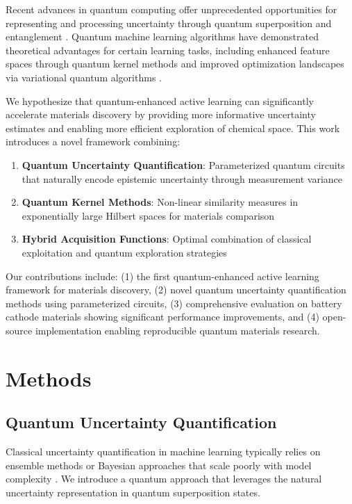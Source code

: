 \documentclass[twocolumn]{article}
\begin{document}
Recent advances in quantum computing offer unprecedented opportunities for representing and processing uncertainty through quantum superposition and entanglement \cite{biamonte2017quantum}. Quantum machine learning algorithms have demonstrated theoretical advantages for certain learning tasks, including enhanced feature spaces through quantum kernel methods \cite{havlicek2019supervised} and improved optimization landscapes via variational quantum algorithms \cite{cerezo2021variational}.

We hypothesize that quantum-enhanced active learning can significantly accelerate materials discovery by providing more informative uncertainty estimates and enabling more efficient exploration of chemical space. This work introduces a novel framework combining:

\begin{enumerate}
\item \textbf{Quantum Uncertainty Quantification}: Parameterized quantum circuits that naturally encode epistemic uncertainty through measurement variance
\item \textbf{Quantum Kernel Methods}: Non-linear similarity measures in exponentially large Hilbert spaces for materials comparison
\item \textbf{Hybrid Acquisition Functions}: Optimal combination of classical exploitation and quantum exploration strategies
\end{enumerate}

Our contributions include: (1) the first quantum-enhanced active learning framework for materials discovery, (2) novel quantum uncertainty quantification methods using parameterized circuits, (3) comprehensive evaluation on battery cathode materials showing significant performance improvements, and (4) open-source implementation enabling reproducible quantum materials research.

\section{Methods}

\subsection{Quantum Uncertainty Quantification}

Classical uncertainty quantification in machine learning typically relies on ensemble methods or Bayesian approaches that scale poorly with model complexity \cite{gal2016dropout}. We introduce a quantum approach that leverages the natural uncertainty representation in quantum superposition states.
\end{document}
